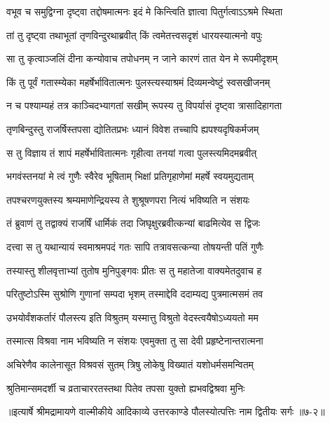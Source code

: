 \twolineshloka
{वभूव च समुद्विग्ना दृष्ट्वा तद्दोषमात्मनः}
{इदं मे किन्त्विति ज्ञात्वा पितुर्गत्वाऽऽश्रमे स्थिता} %

\twolineshloka
{तां तु दृष्ट्वा तथाभूतां तृणविन्दुरथाब्रवीत्}
{किं त्वमेतत्त्वसदृशं धारयस्यात्मनो वपुः} %

\twolineshloka
{सा तु कृत्वाञ्जलिं दीना कन्योवाच तपोधनम्}
{न जाने कारणं तात येन मे रूपमीदृशम्} %

\twolineshloka
{किं तु पूर्वं गतास्म्येका महर्षेर्भावितात्मनः}
{पुलस्त्यस्याश्रमं दिव्यमन्वेष्टुं स्वसखीजनम्} %

\twolineshloka
{न च पश्याम्यहं तत्र काञ्चिदभ्यागतां सखीम्}
{रूपस्य तु विपर्यासं दृष्ट्वा त्रासादिहागता} %

\twolineshloka
{तृणबिन्दुस्तु राजर्षिस्तपसा द्योतितप्रभः}
{ध्यानं विवेश तच्चापि ह्यपश्यदृषिकर्मजम्} %

\twolineshloka
{स तु विज्ञाय तं शापं महर्षेर्भावितात्मनः}
{गृहीत्वा तनयां गत्वा पुलस्त्यमिदमब्रवीत्} %

\twolineshloka
{भगवंस्तनयां मे त्वं गुणैः स्वैरेव भूषिताम्}
{भिक्षां प्रतिगृहाणेमां महर्षे स्वयमुद्यताम्} %

\twolineshloka
{तपश्चरणयुक्तस्य श्रम्यमाणेन्द्रियस्य ते}
{शुश्रूषणपरा नित्यं भविष्यति न संशयः} %

\twolineshloka
{तं ब्रुवाणं तु तद्वाक्यं राजर्षिं धार्मिकं तदा}
{जिघृक्षुरब्रवीत्कन्यां बाढमित्येव स द्विजः} %

\twolineshloka
{दत्त्वा स तु यथान्यायं स्वमाश्रमपदं गतः}
{सापि तत्रावसत्कन्या तोषयन्ती पतिं गुणैः} %

\twolineshloka
{तस्यास्तु शीलवृत्ताभ्यां तुतोष मुनिपुङ्गवः}
{प्रीतः स तु महातेजा वाक्यमेतदुवाच ह} %

\twolineshloka
{परितुष्टोऽस्मि सुश्रोणि गुणानां सम्पदा भृशम्}
{तस्माद्देवि ददाम्यद्य पुत्रमात्मसमं तव} %

\twolineshloka
{उभयोर्वंशकर्तारं पौलस्त्य इति विश्रुतम्}
{यस्मात्तु विश्रुतो वेदस्त्वयैषोऽध्ययतो मम} %

\twolineshloka
{तस्मात्स विश्रवा नाम भविष्यति न संशयः}
{एवमुक्ता तु सा देवी प्रहृष्टेनान्तरात्मना} %

\twolineshloka
{अचिरेणैव कालेनासूत विश्रवसं सुतम्}
{त्रिषु लोकेषु विख्यातं यशोधर्मसमन्वितम्} %

\twolineshloka
{श्रुतिमान्समदर्शी च व्रताचाररतस्तथा}
{पितेव तपसा युक्तो ह्यभवद्विश्रवा मुनिः} %


॥इत्यार्षे श्रीमद्रामायणे वाल्मीकीये आदिकाव्ये उत्तरकाण्डे पौलस्योत्पत्तिः नाम द्वितीयः सर्गः ॥७-२॥
